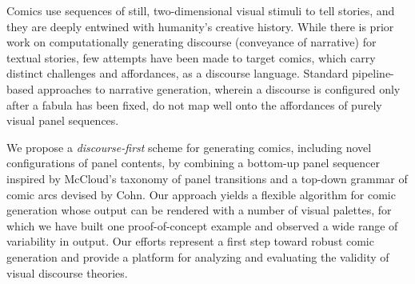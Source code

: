 Comics use sequences of still, two-dimensional visual stimuli to tell
stories, and they are deeply entwined with humanity's creative history.
While there is prior work on computationally generating discourse
(conveyance of narrative) for textual stories, few attempts have been made
to target comics, which carry distinct challenges and affordances, as a
discourse language.  Standard pipeline-based approaches to narrative
generation, wherein a discourse is configured only after a fabula has been
fixed, do not map well onto the affordances of purely visual panel
sequences.



We propose a {\em discourse-first} scheme for generating comics, including novel configurations
of panel contents, by combining a
bottom-up panel sequencer inspired by McCloud's taxonomy of panel
transitions and a top-down grammar of comic arcs devised by Cohn.
Our approach yields a flexible algorithm for comic generation whose output
can be rendered with a number of visual palettes, for which we have built
one proof-of-concept example and observed a wide range of variability in
output. Our efforts represent a first step toward robust comic generation
and provide a platform for analyzing and evaluating the validity of visual
discourse theories.


